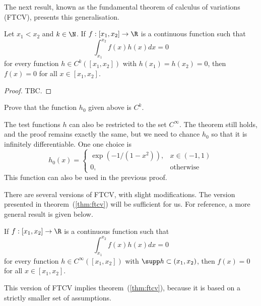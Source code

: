 The next result, known as the fundamental theorem of calculus of variations (FTCV), presents this generalisation.
\begin{nthm}
  \label{thm:ftcv}
  Let $x_1 < x_2$ and $k \in \N$. If $f : [x_1, x_2] \to \R$ is a continuous function such that
  \begin{equation}
    \label{eq:ftcv}
    \int_{x_1}^{x_2} f(x) h(x) dx = 0
  \end{equation}
  for every function $h \in C^{k}([x_1, x_2])$ with $h(x_1)=h(x_2)=0$, then $f(x)=0$ for all $x \in [x_1, x_2]$.
\end{nthm}
\begin{proof}
  TBC.
\end{proof}

\begin{nex}
  Prove that the function $h_0$ given above is $C^{k}$.
\end{nex}

The test functions $h$ can also be restricted to the set $C^{\infty}$. The theorem still holds, and the proof remains exactly the same, but we need to chance $h_0$ so that it is infinitely differentiable. One one choice is
\begin{equation}
  h_0(x) = \begin{cases}\exp(-1/(1-x^2)), & x \in (-1,1)\\ 0, &\text{otherwise}\end{cases}
\end{equation}
This function can also be used in the previous proof.

There are several versions of FTCV, with slight modifications. The version presented in theorem~(\ref{thm:ftcv}) will be sufficient for us. For reference, a more general result is given below.
\begin{nthm}
  \label{thm:ftcv-supp}
  If $f : [x_1, x_2] \to \R$ is a continuous function such that
  \begin{equation}
    \int_{x_1}^{x_2} f(x) h(x) dx = 0
  \end{equation}
  for every function $h \in C^{\infty}([x_1, x_2])$ with $\supp h \subset (x_1, x_2)$, then $f(x)=0$ for all $x \in [x_1, x_2]$.
\end{nthm}
This version of FTCV implies theorem~(\ref{thm:ftcv}), because it is based on a strictly smaller set of assumptions.
